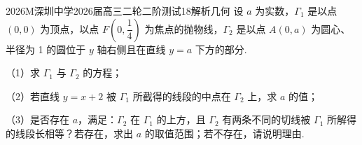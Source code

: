 
\begin{problem}{2026}{M}{深圳中学2026届高三二轮二阶测试}{18}{解析几何}
设 $a$ 为实数，$\Gamma_1$ 是以点 $(0,0)$ 为顶点，以点 $F\left(0,\dfrac{1}{4}\right)$ 为焦点的抛物线，$\Gamma_2$ 是以点 $A(0,a)$ 为圆心、半径为 1 的圆位于 $y$ 轴右侧且在直线 $y=a$ 下方的部分.

（1）求 $\Gamma_1$ 与 $\Gamma_2$ 的方程；

（2）若直线 $y=x+2$ 被 $\Gamma_1$ 所截得的线段的中点在 $\Gamma_2$ 上，求 $a$ 的值；

（3）是否存在 $a$，满足：$\Gamma_2$ 在 $\Gamma_1$ 的上方，且 $\Gamma_2$ 有两条不同的切线被 $\Gamma_1$ 所解得的线段长相等？若存在，求出 $a$ 的取值范围；若不存在，请说明理由.
\end{problem}


